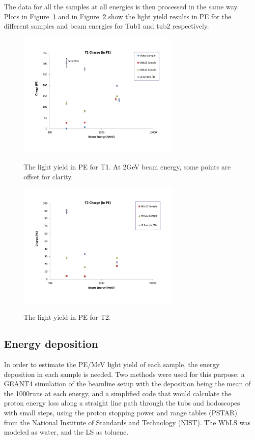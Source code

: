 \documentclass[preprint,12pt]{elsarticle}
\begin{document}
The data for all the samples at all energies is then processed in the same way. Plots in Figure~\ref{tub1signalInPE} and in Figure~\ref{tub2signalInPE} show the light yield results in PE for the different samples and beam energies for Tub1 and tub2 respectively.

\begin{figure}[ht]
	\centering
		\includegraphics[width=80mm]{tub1signalInPE.pdf}
	\label{tub1signalInPE}
	\caption{The light yield in PE for T1. At 2GeV beam energy, some points are offset for clarity.}
\end{figure}

\begin{figure}[ht]
	\centering
		\includegraphics[width=80mm]{tub2signalInPE.pdf}
	\label{tub2signalInPE}
	\caption{The light yield in PE for T2.}
\end{figure}


\subsection{Energy deposition}

In order to estimate the PE/MeV light yield of each sample, the energy deposition in each sample is needed. Two methods were used for this purpose: a GEANT4 simulation of the beamline setup with the deposition being the mean of the 1000runs at each energy, and a simplified code that would calculate the proton energy loss along a straight line path through the tubs and hodoscopes with small steps, using the proton stopping power and range tables (PSTAR) from the National Institute of Standards and Technology (NIST). The WbLS was modeled as water, and the LS as toluene. 
\end{document}
